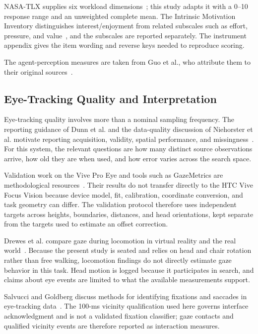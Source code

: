 NASA-TLX supplies six workload dimensions~\cite{hart1988nasatlx}; this study adapts it with a 0--10 response range and an unweighted complete mean. The Intrinsic Motivation Inventory distinguishes interest/enjoyment from related subscales such as effort, pressure, and value~\cite{ryan1982control,mcauley1989imi,csdtIMI}, and the subscales are reported separately. The instrument appendix gives the item wording and reverse keys needed to reproduce scoring.

The agent-perception measures are taken from Guo et al., who attribute them to their original sources~\cite{guo2024doppelganger,biocca2001networked,moussawi2019perception}.

\subsection{Eye-Tracking Quality and Interpretation}
Eye-tracking quality involves more than a nominal sampling frequency. The reporting guidance of Dunn et al. and the data-quality discussion of Niehorster et al. motivate reporting acquisition, validity, spatial performance, and missingness~\cite{dunn2024reporting,niehorster2026dataquality}. For this system, the relevant questions are how many distinct source observations arrive, how old they are when used, and how error varies across the search space.

Validation work on the Vive Pro Eye and tools such as GazeMetrics are methodological resources~\cite{schuetz2022vive,sipatchin2021usability,adhanom2020gazemetrics}. Their results do not transfer directly to the HTC Vive Focus Vision because device model, fit, calibration, coordinate conversion, and task geometry can differ. The validation protocol therefore uses independent targets across heights, boundaries, distances, and head orientations, kept separate from the targets used to estimate an offset correction.

Drewes et al. compare gaze during locomotion in virtual reality and the real world~\cite{drewes2021locomotion}. Because the present study is seated and relies on head and chair rotation rather than free walking, locomotion findings do not directly estimate gaze behavior in this task. Head motion is logged because it participates in search, and claims about eye events are limited to what the available measurements support.

Salvucci and Goldberg discuss methods for identifying fixations and saccades in eye-tracking data~\cite{salvucci2000fixations}. The 100-ms vicinity qualification used here governs interface acknowledgment and is not a validated fixation classifier; gaze contacts and qualified vicinity events are therefore reported as interaction measures.

